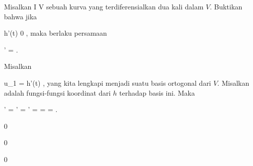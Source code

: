 {

Misalkan
 { I } { V
} {}
sebuah kurva yang terdiferensialkan dua kali dalam
$V$. Buktikan bahwa jika

\mavergleichskette
{\vergleichskette
{h'(t)
}
{ \neq }{ 0
}
{  }{
}
{    }{
}
{   }{
}
}
{}{}{,}
maka berlaku persamaan

\mavergleichskettedisp
{\vergleichskette
{  \Vert'
}
{ =} { {  }  \Vert
}
{ } {
}
{ } {
}
{ } {
}
}
{}{}{.}

}
{

Misalkan

\mavergleichskette
{\vergleichskette
{u_1
}
{ = }{ h'(t)
}
{  }{
}
{    }{
}
{   }{
}
}
{}{}{,}
yang kita lengkapi menjadi suatu basis ortogonal
 dari $V$. Misalkan
 adalah fungsi-fungsi koordinat dari $h$ terhadap basis ini. Maka

\mavergleichskettealign
{\vergleichskettealign
{  \Vert'
}
{ =} {  \Vert'
}
{ =} { '
}
{ =} { {  }
}
{ =} { {  }  
}
}
{
\vergleichskettefortsetzungalign
{ =} { {  }  \Vert
}
{ } {
}
{ } {}
{ } {}
}
{}{.}

 }



{0}

{

}
{  }



{0}

{

}
{  }



{0}

{

}
{  }



